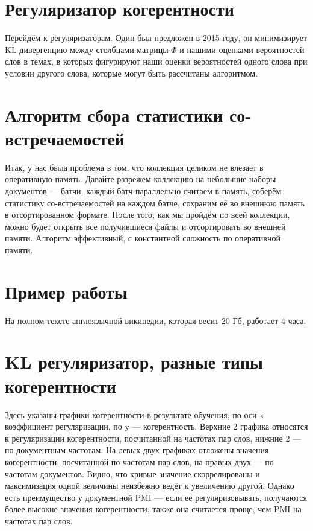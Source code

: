 \documentclass[10pt]{extarticle}
\begin{document}
    \section{Регуляризатор когерентности}
    Перейдём к регуляризаторам. Один был предложен в 2015 году, он минимизирует KL-дивергенцию между столбцами матрицы $\Phi$ и нашими оценками вероятностей слов в темах, в которых фигурируют наши оценки вероятностей одного слова при условии другого слова, которые могут быть рассчитаны алгоритмом.
    \section{Алгоритм сбора статистики со-встречаемостей}
    Итак, у нас была проблема в том, что коллекция целиком не влезает в оперативную память. Давайте разрежем коллекцию на небольшие наборы документов --- батчи, каждый батч параллельно считаем в память, соберём статистику со-встречаемостей на каждом батче, сохраним её во внешнюю память в отсортированном формате. После того, как мы пройдём по всей коллекции, можно будет открыть все получившиеся файлы и отсортировать во внешней памяти. Алгоритм эффективный, с константной сложность по оперативной памяти.
    \section{Пример работы}
    На полном тексте англоязычной википедии, которая весит 20 Гб, работает 4 часа.
    \section{KL регуляризатор, разные типы когерентности}
    Здесь указаны графики когерентности в результате обучения, по оси x коэффициент регуляризации, по y --- когерентность. Верхние 2 графика относятся к регуляризации когерентности, посчитанной на частотах пар слов, нижние 2 --- по документным частотам. На левых двух графиках отложены значения когерентности, посчитанной по частотам пар слов, на правых двух --- по частотам документов. Видно, что кривые значение скоррелированы и максимизация одной величины неизбежно ведёт к увеличению другой. Однако есть преимущество у документной PMI --- если её регуляризовывать, получаются более высокие значения когерентности, также она считается проще, чем PMI на частотах пар слов.
\end{document}

